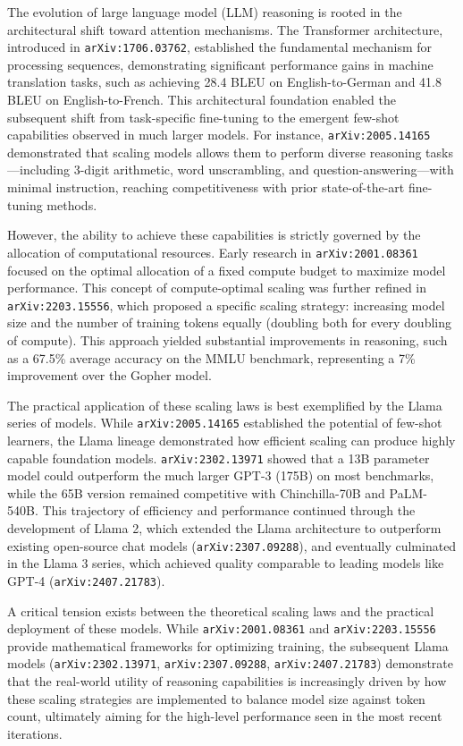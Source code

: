 \documentclass[11pt]{article}
\begin{document}
The evolution of large language model (LLM) reasoning is rooted in the architectural shift toward attention mechanisms. The Transformer architecture, introduced in \texttt{arXiv:1706.03762}, established the fundamental mechanism for processing sequences, demonstrating significant performance gains in machine translation tasks, such as achieving 28.4 BLEU on English-to-German and 41.8 BLEU on English-to-French. This architectural foundation enabled the subsequent shift from task-specific fine-tuning to the emergent few-shot capabilities observed in much larger models. For instance, \texttt{arXiv:2005.14165} demonstrated that scaling models allows them to perform diverse reasoning tasks—including 3-digit arithmetic, word unscrambling, and question-answering—with minimal instruction, reaching competitiveness with prior state-of-the-art fine-tuning methods.

However, the ability to achieve these capabilities is strictly governed by the allocation of computational resources. Early research in \texttt{arXiv:2001.08361} focused on the optimal allocation of a fixed compute budget to maximize model performance. This concept of compute-optimal scaling was further refined in \texttt{arXiv:2203.15556}, which proposed a specific scaling strategy: increasing model size and the number of training tokens equally (doubling both for every doubling of compute). This approach yielded substantial improvements in reasoning, such as a 67.5\% average accuracy on the MMLU benchmark, representing a 7\% improvement over the Gopher model.

The practical application of these scaling laws is best exemplified by the Llama series of models. While \texttt{arXiv:2005.14165} established the potential of few-shot learners, the Llama lineage demonstrated how efficient scaling can produce highly capable foundation models. \texttt{arXiv:2302.13971} showed that a 13B parameter model could outperform the much larger GPT-3 (175B) on most benchmarks, while the 65B version remained competitive with Chinchilla-70B and PaLM-540B. This trajectory of efficiency and performance continued through the development of Llama 2, which extended the Llama architecture to outperform existing open-source chat models (\texttt{arXiv:2307.09288}), and eventually culminated in the Llama 3 series, which achieved quality comparable to leading models like GPT-4 (\texttt{arXiv:2407.21783}).

A critical tension exists between the theoretical scaling laws and the practical deployment of these models. While \texttt{arXiv:2001.08361} and \texttt{arXiv:2203.15556} provide mathematical frameworks for optimizing training, the subsequent Llama models (\texttt{arXiv:2302.13971}, \texttt{arXiv:2307.09288}, \texttt{arXiv:2407.21783}) demonstrate that the real-world utility of reasoning capabilities is increasingly driven by how these scaling strategies are implemented to balance model size against token count, ultimately aiming for the high-level performance seen in the most recent iterations.
\end{document}
